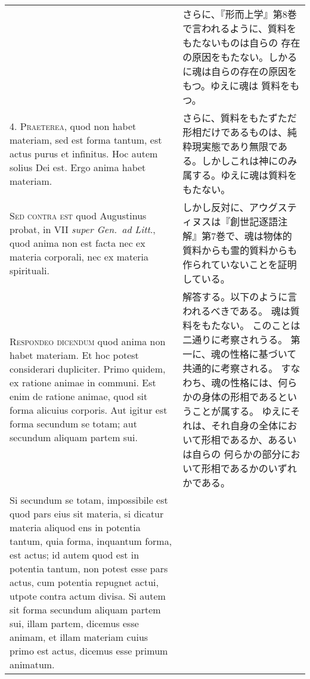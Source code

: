 \documentclass[paper=a4paper,fontsize=10pt,jafontsize=9pt,titlepage]{jlreq}
\begin{document}
\begin{longtable}{p{21em}p{21em}}
&

さらに、『形而上学』第8巻で言われるように、質料をもたないものは自らの
 存在の原因をもたない。しかるに魂は自らの存在の原因をもつ。ゆえに魂は
 質料をもつ。


\\



4. {\scshape Praeterea}, quod non habet materiam, sed est forma
tantum, est actus purus et infinitus. Hoc autem solius Dei est. Ergo
anima habet materiam.


&

さらに、質料をもたずただ形相だけであるものは、純粋現実態であり無限であ
 る。しかしこれは神にのみ属する。ゆえに魂は質料をもたない。

\\



{\scshape Sed contra est} quod Augustinus probat, in VII {\itshape
super Gen.~ad Litt}., quod anima non est facta nec ex materia
corporali, nec ex materia spirituali.


&

しかし反対に、アウグスティヌスは『創世記逐語注解』第7巻で、魂は物体的
 質料からも霊的質料からも作られていないことを証明している。

\\



{\scshape Respondeo dicendum} quod anima non habet materiam. Et hoc
potest considerari dupliciter. Primo quidem, ex ratione animae in
communi. Est enim de ratione animae, quod sit forma alicuius
corporis. Aut igitur est forma secundum se totam; aut secundum aliquam
partem sui. 


&

解答する。以下のように言われるべきである。
魂は質料をもたない。
このことは二通りに考察されうる。
第一に、魂の性格に基づいて共通的に考察される。
すなわち、魂の性格には、何らかの身体の形相であるということが属する。
ゆえにそれは、それ自身の全体において形相であるか、あるいは自らの
何らかの部分において形相であるかのいずれかである。


\\

Si secundum se totam, impossibile est quod pars eius sit
materia, si dicatur materia aliquod ens in potentia tantum, quia
forma, inquantum forma, est actus; id autem quod est in potentia
tantum, non potest esse pars actus, cum potentia repugnet actui,
utpote contra actum divisa. Si autem sit forma secundum aliquam partem
sui, illam partem, dicemus esse animam, et illam materiam cuius primo
est actus, dicemus esse primum animatum. 




\end{longtable}
\end{document}
